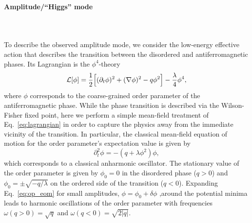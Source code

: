 \documentclass[reprint,twocolumn,secnumarabic,amssymb, aps, prx]{revtex4-2}
\begin{document}
\noindent\textbf{Amplitude/``Higgs'' mode}\\
\\
 \\
\\
To describe the observed amplitude mode, we consider the low-energy effective action that describes the transition between the disordered and antiferromagnetic phases. Its Lagrangian is the $\phi^4$-theory
\begin{align} \label{eq:lagrangian}
    {\cal L}[\phi] = \frac{1}{2} \Big[ (\partial_t \phi)^2 + (\nabla \phi)^2 - q \phi^2 \Big] - \frac{\lambda}{4}\phi^4, 
\end{align}
where $\phi$ corresponds to the coarse-grained order parameter of the antiferromagnetic phase.
While the phase transition %
is described via the Wilson-Fisher fixed point, here we perform a simple mean-field treatment of Eq.~\eqref{eq:lagrangian} in order to capture the physics away from the immediate vicinity of the transition.
In particular, the classical mean-field equation of motion for the order parameter's expectation value is given by
\begin{equation} \label{eq:op_eom}
    \partial_t^2 \phi = - (q+\lambda \phi^2) \phi,
\end{equation}
which corresponds to a classical anharmonic oscillator. The stationary value of the order parameter is given by $\phi_0=0$ in the disordered phase ($q>0$) and $\phi_0 = \pm \sqrt{-q/\lambda}$ on the ordered side of the transition ($q<0$). 
Expanding Eq.~\eqref{eq:op_eom} for small amplitudes, $\phi = \phi_0 + \delta \phi$ ,around the potential minima leads to harmonic oscillations of the order parameter with frequencies $\omega(q>0) = \sqrt{q}$ and $\omega(q<0) = \sqrt{2|q|}$.\\
\end{document}
